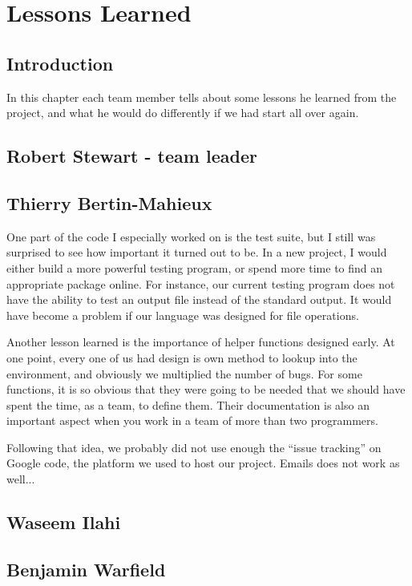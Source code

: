 
\chapter{Lessons Learned}


\section{Introduction}
In this chapter each team member tells about some lessons he learned from
the project, and what he would do differently if we had start all over
again.


\section{Robert Stewart - team leader}


\section{Thierry Bertin-Mahieux}
One part of the code I especially worked on is the test suite, but I still
was surprised to see how important it turned out to be. In a new project,
I would either build a more powerful testing program, or spend more
time to find an appropriate package online. For instance, our current
testing program does not have the ability to test an output file instead
of the standard output. It would have become a problem if our language was
designed for file operations.

Another lesson learned is the importance of helper functions designed early.
At one point, every one of us had design is own method to lookup into the
environment, and obviously we multiplied the number of bugs. For some
functions, it is so obvious that they were going to be needed that we should
have spent the time, as a team, to define them. Their documentation is
also an important aspect when you work in a team of more than two programmers.

Following that idea, we probably did not use enough the ``issue tracking''
on Google code, the platform we used to host our project. Emails does not
work as well...


\section{Waseem Ilahi}


\section{Benjamin Warfield}


